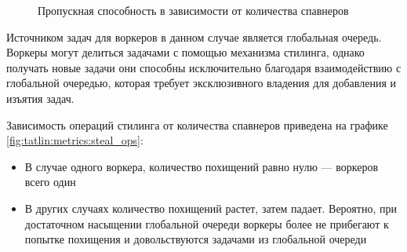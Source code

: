 \begin{figure}[H]
    \begin{center}
    \end{center}

    \caption{Пропускная способность в зависимости от количества спавнеров}
    \label{fig:tatlin:line:nspawn:5000:from:8}
\end{figure}

Источником задач для воркеров в данном случае является глобальная очередь. Воркеры могут делиться задачами с помощью механизма стилинга, однако получать новые задачи они способны исключительно благодаря взаимодействию с глобальной очередью, которая требует эксклюзивного владения для добавления и изъятия задач.

Зависимость операций стилинга от количества спавнеров приведена на графике \ref{fig:tatlin:metrics:steal_ops}:

\begin{itemize}
    \item В случае одного воркера, количество похищений равно нулю --- воркеров всего один
    \item В других случаях количество похищений растет, затем падает. Вероятно, при достаточном насыщении глобальной очереди воркеры более не прибегают к попытке похищения и довольствуются задачами из глобальной очереди
\end{itemize}

